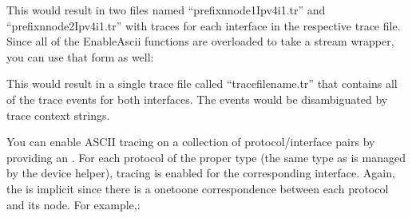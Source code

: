 \documentclass[letterpaper,10pt,english]{sphinxmanual}
\renewcommand{\sphinxcode}[1]{\texttt{\small{#1}}}
\begin{document}
This would result in two files named “prefix\sphinxhyphen{}nnode1Ipv4\sphinxhyphen{}i1.tr” and
“prefix\sphinxhyphen{}nnode2Ipv4\sphinxhyphen{}i1.tr” with traces for each interface in the respective
trace file. Since all of the EnableAscii functions are overloaded to take a
stream wrapper, you can use that form as well:

\begin{sphinxVerbatim}[commandchars=\\\{\}]
  
  
    
   
   
\end{sphinxVerbatim}

This would result in a single trace file called “trace\sphinxhyphen{}file\sphinxhyphen{}name.tr” that
contains all of the trace events for both interfaces. The events would be
disambiguated by trace context strings.

You can enable ASCII tracing on a collection of protocol/interface pairs by
providing an \sphinxcode{}. For each protocol of the proper type
(the same type as is managed by the device helper), tracing is enabled for the
corresponding interface.  Again, the \sphinxcode{} is implicit since there is a
one\sphinxhyphen{}to\sphinxhyphen{}one correspondence between each protocol and its node. For example,:
\end{document}
